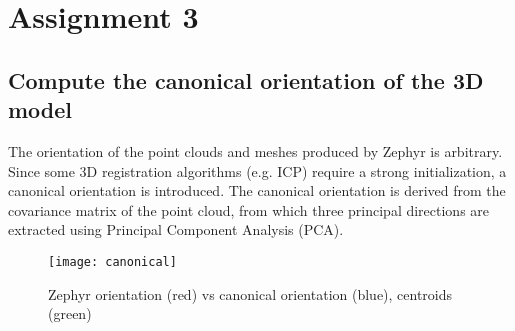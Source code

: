 \section{Assignment 3}

\subsection{Compute the canonical orientation of the 3D model}

The orientation of the point clouds and meshes produced by Zephyr is arbitrary. Since some 3D registration algorithms (e.g. ICP) require a strong initialization, a canonical orientation is introduced. The canonical orientation is derived from the covariance matrix of the point cloud, from which three principal directions are extracted using Principal Component Analysis (PCA).

\begin{figure}[h]
\centering
\texttt{[image: canonical]}
\caption{Zephyr orientation (red) vs canonical orientation (blue), centroids (green)}
\end{figure}